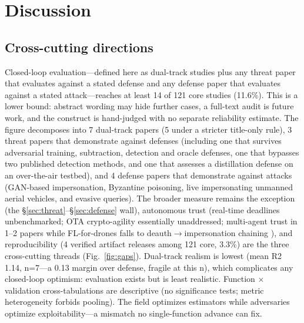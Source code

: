 \documentclass[10.5pt,compsoc,winfonts]{ICN}
\newcommand{\upcite}[1]{\cite{#1}}
\begin{document}
\section{Discussion}
\subsection{Cross-cutting directions}
\label{sec:cross}
Closed-loop evaluation—defined here as dual-track studies plus any threat paper that
evaluates against a stated defense and any defense paper that evaluates against a stated
attack—reaches at least 14 of 121 core studies (11.6\%). This is a lower bound: abstract
wording may hide further cases, a full-text audit is future work, and the construct is
hand-judged with no separate reliability estimate. The figure decomposes into 7 dual-track
papers \upcite{D08,D36,D37,T05,T11,T14,T46} (5 under a stricter title-only rule), 3 threat papers that demonstrate against defenses
(including one that survives adversarial training, subtraction, detection and oracle defenses,
one that bypasses two published detection methods, and one that assesses a distillation defense
on an over-the-air testbed), and 4 defense papers that demonstrate against attacks (GAN-based
impersonation, Byzantine poisoning, live impersonating unmanned aerial vehicles, and evasive
queries). The broader measure remains the exception (the \S\ref{sec:threat}–\S\ref{sec:defense} wall), autonomous trust (real-time deadlines unbenchmarked; OTA crypto-agility essentially unaddressed; multi-agent trust in 1–2 papers while FL-for-drones falls to deauth$\rightarrow$impersonation chaining \upcite{T36}), and reproducibility (4 verified artifact releases among 121 core, 3.3\%) are the three cross-cutting threads (Fig.~\ref{fig:gaps}). Dual-track realism is lowest (mean R2 1.14, n=7—a 0.13 margin over defense, fragile at this n), which complicates any closed-loop optimism: evaluation exists but is least realistic. Function $\times$ validation cross-tabulations are descriptive (no significance tests; metric heterogeneity forbids pooling). The field optimizes estimators while adversaries optimize exploitability—a mismatch no single-function advance can fix.
\end{document}
